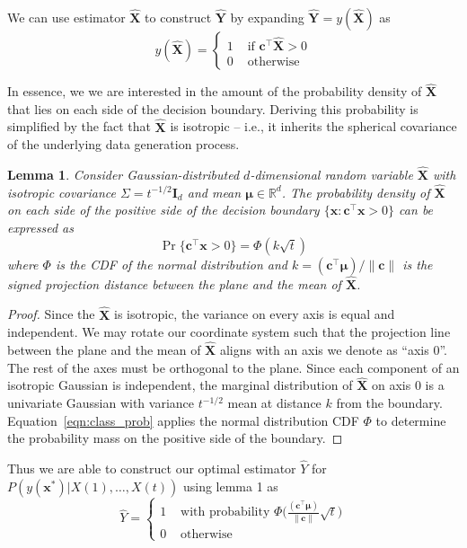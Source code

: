 \documentclass[12pt]{article}
\newtheorem{lemma}{Lemma}
\begin{document}
We can use estimator $\hat{\mathbf X}$ to construct $\hat{\mathbf Y}$ by expanding $\hat{\mathbf Y} = y(\hat{\mathbf X})$ as 
\begin{equation}
	y(\hat{\mathbf X}) = \begin{cases}
		1 & \text{ if } \mathbf c^\top \hat{\mathbf X} > 0 \\ 
		0 & \text{ otherwise } 
	\end{cases}
\end{equation}

In essence, we we are interested in the amount of the probability density of $\hat{\mathbf X}$ that lies on each side of the decision boundary. 
Deriving this probability is simplified by the fact that $\hat{\mathbf X}$ is isotropic -- i.e., it inherits the spherical covariance of the underlying data generation process. 

\begin{lemma}
	\label{lemma:zscore}
	Consider Gaussian-distributed $d$-dimensional random variable $\hat{\mathbf X}$ with isotropic covariance $\Sigma = t^{-1/2}\mathbf I_d$ and mean $\mathbf \mu \in \mathbb R^d$.
	The probability density of $\hat{\mathbf X}$ on each side of the positive side of the decision boundary $\{\mathbf x : \mathbf c^\top \mathbf x > 0\}$ can be expressed as 
	\begin{equation}
		\label{eqn:class_prob}
		\Pr\{\mathbf c^\top \mathbf x > 0\} = \Phi(k\sqrt{t})
	\end{equation}
	where $\Phi$ is the CDF of the normal distribution and $k = \mathbf{(c^\top \mu)/ \|\mathbf c\|}$ is the signed projection distance between the plane and the mean of $\hat{\mathbf X}$. 
\end{lemma}
\begin{proof}
	Since the $\hat{\mathbf X}$ is isotropic, the variance on every axis is equal and independent. 
	We may rotate our coordinate system such that the projection line between the plane and the mean of $\hat{\mathbf X}$ aligns with an axis we denote as ``axis 0''. 
	The rest of the axes must be orthogonal to the plane. 
	Since each component of an isotropic Gaussian is independent, the marginal distribution of $\hat{\mathbf X}$ on axis 0 is a univariate Gaussian with variance $t^{-1/2}$ mean at distance $k$ from the boundary. 
	Equation~\ref{eqn:class_prob} applies the normal distribution CDF $\Phi$ to determine the probability mass on the positive side of the boundary. 
\end{proof}


Thus we are able to construct our optimal estimator $\hat{Y}$ for $P(y(\mathbf x^*) | X(1), \dots, X(t))$ using lemma 1 as 
\begin{equation}
	\label{eqn:single_estimator}
	\hat{Y} = \begin{cases}
		1 & \text{ with probability } \Phi\big( 
			\frac{
				\mathbf{(c^\top \mu)}
			}{
				\|\mathbf c\|
			}
			\sqrt t
			\big)\\ 
		0 & \text{ otherwise } 
	\end{cases}
\end{equation}
\end{document}
